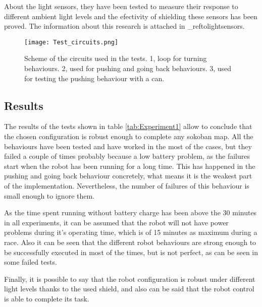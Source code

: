 About the light sensors, they have been tested to measure their response to different ambient light levels and the efectivity of shielding these sensors has been proved.
The information about this research is attached in \_reftolightsensors.


\begin{figure}[H]
\texttt{[image: Test\_circuits.png]}
\centering
\caption{Scheme of the circuits used in the tests. 1, loop for turning behaviours. 2, used for pushing and going back behaviours. 3, used for testing the pushing behaviour with a can. }
\label{fig:testMaps}
\end{figure}


\subsection{Results}
	The results of the tests shown in table \ref{tab:Experiment1} allow to conclude that the chosen configuration is robust enough to complete any sokoban map.
	All the behaviours have been tested and have worked in the most of the cases, but they failed a couple of times probably because a low battery problem, as the failures start when the robot has been running for a long time.
	This has happened in the pushing and going back behaviour concretely, what means it is the weakest part of the implementation.
	Nevertheless, the number of failures of this behaviour is small enough to ignore them.
	
	As the time spent running without battery charge has been above the 30 minutes in all experiments, it can be assumed that the robot will not have power problems during it's operating time, which is of 15 minutes as maximum during a race.
	Also it can be seen that the different robot behaviours are strong enough to be successfully executed in most of the times, but is not perfect, as can be seen in some failed tests.
	
	Finally, it is possible to say that the robot configuration is robust under different light levels thanks to the used shield, and also can be said that the robot control is able to complete its task.


